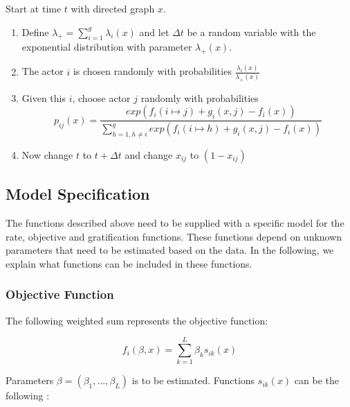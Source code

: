 \documentclass[11pt]{report}
\begin{document}
Start at time $t$ with directed graph $x$. 
\begin{enumerate}
\item Define $\lambda_{+} = \sum_{i=1}^g \lambda_i(x)$ and let $\Delta t$ be a random variable with the exponential distribution with parameter $\lambda_{+}(x)$.
\item The actor $i$ is chosen randomly with probabilities $\frac{\lambda_{i}(x)}{\lambda_{+}(x)}$
\item Given this $i$, choose actor $j$ randomly with probabilities 
\begin{equation}
p_{ij}(x) = \frac{exp(f_i(i \mapsto j) + g_i(x, j) - f_i(x))}{\sum_{h=1, h \neq i}^{g} exp(f_i(i \mapsto h) + g_i(x, j) - f_i(x))} \nonumber
\end{equation}
\item Now change $t$ to $t + \Delta t$ and change $x_{ij}$ to $(1 - x_{ij})$
\end{enumerate}

\subsection{Model Specification}
The functions described above need to be supplied with a specific model for the rate, objective and gratification functions. These functions depend on unknown parameters that need to be estimated based on the data. In the following, we explain what functions can be included in these functions.

\subsubsection{Objective Function}
The following weighted sum represents the objective function:

\begin{equation}
f_i(\beta, x) = \sum_{k = 1}^{L} \beta_k s_{ik}(x)
\end{equation}

Parameters $\beta = (\beta_1, ..., \beta_L)$ is to be estimated. Functions $s_{ik}(x)$ can be the following \cite{Snijders2004}:
\end{document}
